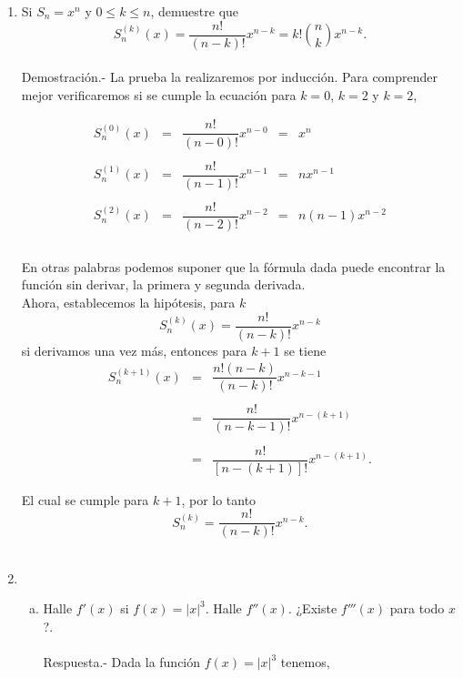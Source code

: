 \begin{enumerate}[\bfseries 1]
\begin{enumerate}[(i)]
	\end{enumerate}

    \item Si $S_n=x^n$ y $0\leq k\leq n$, demuestre que 
    $$S_n^{(k)}(x)=\dfrac{n!}{(n-k)!}x^{n-k}=k!{n\choose k}x^{n-k}.$$\\
	Demostración.-\; La prueba la realizaremos por inducción. Para comprender mejor verificaremos  si se cumple la ecuación para $k=0$, $k=2$ y $k=2$, 

	$$\begin{array}{rclcl}
	    S_n^{(0)}(x)&=&\dfrac{n!}{(n-0)!}x^{n-0}&=&x^n\\\\
	    S_n^{(1)}(x)&=&\dfrac{n!}{(n-1)!}x^{n-1}&=&nx^{n-1}\\\\
	    S_n^{(2)}(x)&=&\dfrac{n!}{(n-2)!}x^{n-2}&=&n(n-1)x^{n-2}\\\\
	\end{array}$$

	En otras palabras podemos suponer que la fórmula dada puede encontrar la función sin derivar, la primera y segunda derivada.\\

	
	Ahora, establecemos la hipótesis, para $k$ 
	$$S_n^{(k)}(x)=\dfrac{n!}{(n-k)!}x^{n-k}$$
	si derivamos una vez más, entonces para $k+1$ se tiene
	$$\begin{array}{rcl}
	    S_n^{(k+1)}(x)&=&\dfrac{n!(n-k)}{(n-k)!}x^{n-k-1}\\\\
			  &=&\dfrac{n!}{(n-k-1)!}x^{n-(k+1)}\\\\
			  &=&\dfrac{n!}{\left[n-(k+1)\right]!}x^{n-(k+1)}.
	\end{array}$$

	El cual se cumple para $k+1$, por lo tanto
	$$S_n^{(k)}=\dfrac{n!}{(n-k)!}x^{n-k}.$$\\


    \item 
	\begin{enumerate}[(a)]

	    \item Halle $f'(x)$ si $f(x)=|x|^3$. Halle $f''(x)$. ¿Existe $f'''(x)$ para todo $x$?.\\\\
		Respuesta.-\; Dada la función $f(x)=|x|^3$ tenemos,


\end{enumerate}
\end{enumerate}

